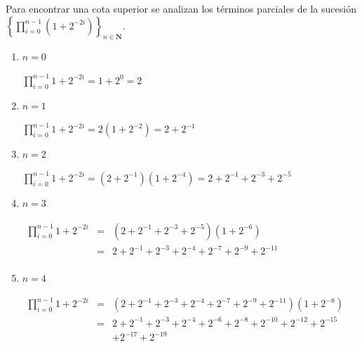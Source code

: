 Para encontrar una cota superior se analizan los términos parciales de la sucesión $\left\{\prod_{i=0}^{n-1}
\left(1+2^{-2i}\right)\right\}_{n \in \mathbf{N}}$.

\begin{enumerate}

\item $n=0$

\hspace{1cm}
\begin{math}
\displaystyle\prod_{i=0}^{n-1} 1+2^{-2i}=1+2^0=2
\end{math}


\item $n=1$

\hspace{1cm}
\begin{math}
\displaystyle\prod_{i=0}^{n-1} 1+2^{-2i}=2\left(1+2^{-2}\right)=2+2^{-1}
\end{math}


\item $n=2$

\hspace{1cm}
\begin{math}
\displaystyle\prod_{i=0}^{n-1} 1+2^{-2i}=\left(2+2^{-1}\right)
\left(1+2^{-4}\right)=2+2^{-1}+2^{-3}+2^{-5}
\end{math}


\item $n=3$

\hspace{1cm}
\begin{math}
\begin{array}{lll}
\displaystyle\prod_{i=0}^{n-1} 1+2^{-2i} & = & \left(2+2^{-1}+2^{-3}+2^{-5}\right) \left(1+2^{-6}\right)\\
							& = & 2+2^{-1}+2^{-3}+2^{-4}+2^{-7}+2^{-9}+2^{-11}\\
\end{array}
\end{math}


\item $n=4$

\hspace{1cm}
\begin{math}
\begin{array}{lll}
\displaystyle\prod_{i=0}^{n-1}
1+2^{-2i} & = & \left(2+2^{-1}+2^{-3}+2^{-4}+2^{-7}+2^{-9}+2^{-11}\right) \left(1+2^{-8}\right)\\
          & = & 2+2^{-1}+2^{-3}+2^{-4}+2^{-6}+2^{-8}+2^{-10}+2^{-12}+2^{-15}\\
		  &   & +2^{-17}+2^{-19}\\
\end{array}
\end{math}



\end{enumerate}
